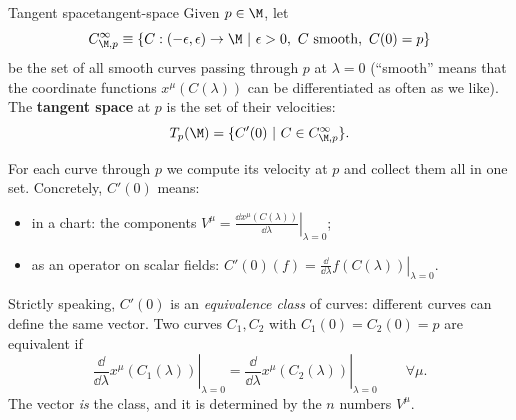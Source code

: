 \begin{definition}{Tangent space}{tangent-space}
Given $p\in\M$, let
\[
  C^\infty_{\M,p}\equiv\{C:(-\epsilon,\epsilon)\to\M\ |\ \epsilon>0,\ C\ \text{smooth},\ C(0)=p\}
\]
be the set of all smooth curves passing through $p$ at $\lambda=0$ (``smooth'' means that the coordinate functions $x^\mu(C(\lambda))$ can be differentiated as often as we like). The \textbf{tangent space} at $p$ is the set of their velocities:
\begin{equation}
  T_p(\M)=\{C'(0)\ |\ C\in C^\infty_{\M,p}\}.
\end{equation}
\end{definition}
For each curve through $p$ we compute its velocity at $p$ and collect them all in one set. Concretely, $C'(0)$ means:
\begin{itemize}[nosep]
  \item in a chart: the components $V^\mu=\left.\frac{\dd x^\mu(C(\lambda))}{\dd\lambda}\right|_{\lambda=0}$;
  \item as an operator on scalar fields: $C'(0)(f)=\left.\frac{\dd}{\dd\lambda}f(C(\lambda))\right|_{\lambda=0}$.
\end{itemize}
Strictly speaking, $C'(0)$ is an \emph{equivalence class} of curves: different curves can define the same vector. Two curves $C_1,C_2$ with $C_1(0)=C_2(0)=p$ are equivalent if
\begin{equation}
  \left.\frac{\dd}{\dd\lambda}x^\mu(C_1(\lambda))\right|_{\lambda=0}=\left.\frac{\dd}{\dd\lambda}x^\mu(C_2(\lambda))\right|_{\lambda=0}\qquad\forall\mu .
\end{equation}
The vector \emph{is} the class, and it is determined by the $n$ numbers $V^\mu$.

